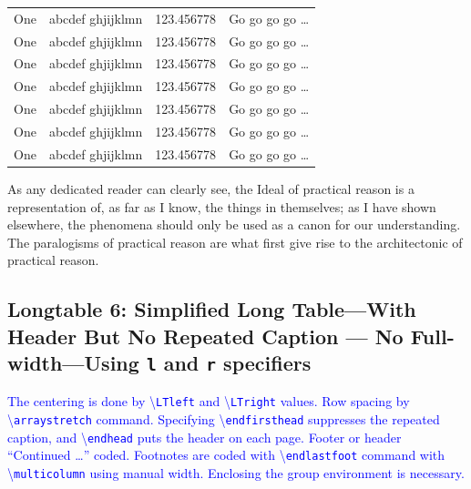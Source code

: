 \documentclass[phd,showframe]{ndsu-thesis-2022}
\newcommand\italk[1]{\textcolor{blue}{#1}}  %
\newcommand\cmd[1]{\textbackslash\texttt{#1}}  %
\begin{document}
\begin{longtable}{l l l l}
One & abcdef ghjijklmn & 123.456778  & Go go go go \ldots \\
One & abcdef ghjijklmn & 123.456778  & Go go go go \ldots \\
One & abcdef ghjijklmn & 123.456778  & Go go go go \ldots \\
One & abcdef ghjijklmn & 123.456778  & Go go go go \ldots \\
One & abcdef ghjijklmn & 123.456778  & Go go go go \ldots \\
One & abcdef ghjijklmn & 123.456778  & Go go go go \ldots \\
One & abcdef ghjijklmn & 123.456778  & Go go go go \ldots \\
\bottomrule
\end{longtable}
\endgroup

As any dedicated reader can clearly see, the Ideal of practical reason is a representation of, as far as I know, the things in themselves; as I have shown elsewhere, the phenomena should only be used as a canon for our understanding. The paralogisms of practical reason are what first give rise to the architectonic of practical reason.


\subsection{Longtable 6: Simplified Long Table---With Header But No Repeated Caption --- No Full-width---Using \texttt{l} and \texttt{r} specifiers}

\italk{The centering is done by \cmd{LTleft} and \cmd{LTright} values. Row spacing by \cmd{arraystretch} command. Specifying \cmd{endfirsthead} suppresses the repeated caption, and \cmd{endhead} puts the header on each page. Footer or header ``Continued \ldots'' coded. Footnotes are coded with \cmd{endlastfoot} command with \cmd{multicolumn} using manual width. Enclosing the group environment is necessary.}

\begingroup

\newcommand{\heads}{
\toprule
\textbf{First column} & \textbf{Second column} & \textbf{Third column} & Where? & Number\\ 
\midrule
}

\setlength{\LTleft}{0.5cm plus -1fill}%
\setlength{\LTright}{\LTleft}%
\renewcommand{\arraystretch}{0.6}%
\end{document}
